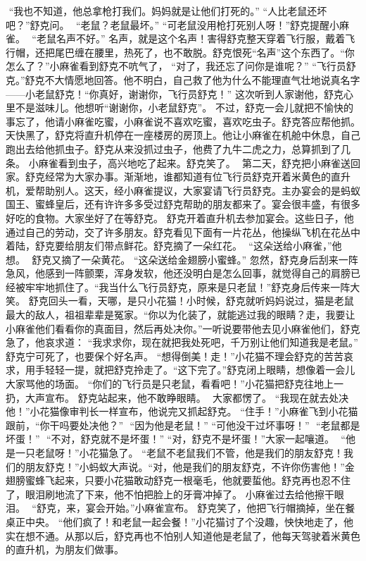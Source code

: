 \documentclass[a4paper,12pt,UTF8,twoside]{ctexbook}
\begin{document}
​    “我也不知道，他总拿枪打我们。妈妈就是让他们打死的。” 
​    “人比老鼠还坏吧？”舒克问。 
​    “老鼠？老鼠最坏。” 
​    “可老鼠没用枪打死别人呀！”舒克提醒小麻雀。 
​    “老鼠名声不好。” 
​    名声，就是这个名声！害得舒克整天穿着飞行服，戴着飞行帽，还把尾巴缠在腰里，热死了，也不敢脱。舒克恨死“名声”这个东西了。 
​    “你怎么了？”小麻雀看到舒克不吭气了，  “对了，我还忘了问你是谁呢？” 
​    “飞行员舒克。”舒克不大情愿地回答。他不明白，自己救了他为什么不能理直气壮地说真名字——小老鼠舒克！ 
​    “你真好，谢谢你，飞行员舒克！” 
​    这次听到人家谢他，舒克心里不是滋味儿。他想听“谢谢你，小老鼠舒克”。 
​    不过，舒克一会儿就把不愉快的事忘了，他请小麻雀吃蜜，小麻雀说不喜欢吃蜜，喜欢吃虫子。舒克答应帮他抓。 
​    天快黑了，舒克将直升机停在一座楼房的房顶上。他让小麻雀在机舱中休息，自己跑出去给他抓虫子。 
​    舒克从来没抓过虫子，他费了九牛二虎之力，总算抓到了几条。 
​    小麻雀看到虫子，高兴地吃了起来。舒克笑了。 
​    第二天，舒克把小麻雀送回家。 
​    舒克经常为大家办事。渐渐地，谁都知道有位飞行员舒克开着米黄色的直升机，爱帮助别人。 
​    这天，经小麻雀提议，大家宴请飞行员舒克。主办宴会的是蚂蚁国王、蜜蜂皇后，还有许许多多受过舒克帮助的朋友都来了。 
​    宴会很丰盛，有很多好吃的食物。大家坐好了在等舒克。 
​    舒克开着直升机去参加宴会。这些日子，他通过自己的劳动，交了许多朋友。舒克看见下面有一片花丛，他操纵飞机在花丛中着陆，舒克要给朋友们带点鲜花。 
​    舒克摘了一朵红花。 
​    “这朵送给小麻雀，”他想。 
​    舒克又摘了一朵黄花。 
​    “这朵送给金翅膀小蜜蜂。” 
​    忽然，舒克身后刮来一阵急风，他感到一阵颤栗，浑身发软，他还没明白是怎么回事，就觉得自己的肩膀已经被牢牢地抓住了。 
​    “我当什么飞行员舒克，原来是只老鼠！”舒克身后传来一阵大笑。 
​    舒克回头一看，天哪，是只小花猫！小时候，舒克就听妈妈说过，猫是老鼠最大的敌人，祖祖辈辈是冤家。 
​    “你以为化装了，就能逃过我的眼睛？走，我要让小麻雀他们看看你的真面目，然后再处决你。” 
​    一听说要带他去见小麻雀他们，舒克急了，他哀求道： 
​    “我求求你，现在就把我处死吧，千万别让他们知道我是老鼠。” 
​    舒克宁可死了，也要保个好名声。 
​    “想得倒美！走！”小花猫不理会舒克的苦苦哀求，用手轻轻一提，就把舒克拎走了。 
​    “这下完了。”舒克闭上眼睛，想像着一会儿大家骂他的场面。 
​    “你们的飞行员是只老鼠，看看吧！”小花猫把舒克往地上一扔，大声宣布。 
​    舒克站起来，他不敢睁眼睛。 
​    大家都愣了。 
​    “我现在就去处决他！”小花猫像审判长一样宣布，他说完又抓起舒克。 
​    “住手！”小麻雀飞到小花猫跟前，“你干吗要处决他？” 
​    “因为他是老鼠！” 
​    “可他没干过坏事呀！” 
​    “老鼠都是坏蛋！” 
​    “不对，舒克就不是坏蛋！” 
​    “对，舒克不是坏蛋！”大家一起嚷道。 
​    “他是一只老鼠呀！”小花猫急了。 
​    “老鼠不老鼠我们不管，他是我们的朋友舒克！我们的朋友舒克！”小蚂蚁大声说。 
​    “对，他是我们的朋友舒克，不许你伤害他！”金翅膀蜜蜂飞起来，只要小花猫敢动舒克一根毫毛，他就要蜇他。 
​    舒克再也忍不住了，眼泪刷地流了下来，他不怕把脸上的牙膏冲掉了。 
​    小麻雀过去给他擦干眼泪。 
​    “舒克，来，宴会开始。”小麻雀宣布。 
​    舒克笑了，他把飞行帽摘掉，坐在餐桌正中央。 
​    “他们疯了！和老鼠一起会餐！”小花猫讨了个没趣，怏快地走了，他实在想不通。 
​    从那以后，舒克再也不怕别人知道他是老鼠了，他每天驾驶着米黄色的直升机，为朋友们做事。   
\end{document}
